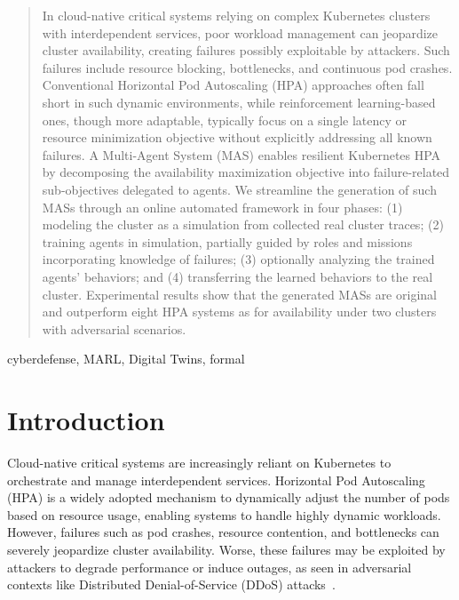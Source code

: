 \documentclass[conference]{IEEEtran}
\begin{document}
\maketitle

\begin{abstract}
  In cloud-native critical systems relying on complex Kubernetes clusters with interdependent services, poor workload management can jeopardize cluster availability, creating failures possibly exploitable by attackers. Such failures include resource blocking, bottlenecks, and continuous pod crashes. Conventional Horizontal Pod Autoscaling (HPA) approaches often fall short in such dynamic environments, while reinforcement learning-based ones, though more adaptable, typically focus on a single latency or resource minimization objective without explicitly addressing all known failures.
  A Multi-Agent System (MAS) enables resilient Kubernetes HPA by decomposing the availability maximization objective into failure-related sub-objectives delegated to agents. We streamline the generation of such MASs through an online automated framework in four phases: (1) modeling the cluster as a simulation from collected real cluster traces; (2) training agents in simulation, partially guided by roles and missions incorporating knowledge of failures; (3) optionally analyzing the trained agents' behaviors; and (4) transferring the learned behaviors to the real cluster.
  Experimental results show that the generated MASs are original and outperform eight HPA systems as for availability under two clusters with adversarial scenarios.
\end{abstract}

\begin{IEEEkeywords}
    cyberdefense, MARL, Digital Twins, formal
\end{IEEEkeywords}

\section{Introduction}
\label{sec:introduction}

Cloud-native critical systems are increasingly reliant on Kubernetes to orchestrate and manage interdependent services. Horizontal Pod Autoscaling (HPA) is a widely adopted mechanism to dynamically adjust the number of pods based on resource usage, enabling systems to handle highly dynamic workloads. However, failures such as pod crashes, resource contention, and bottlenecks can severely jeopardize cluster availability. Worse, these failures may be exploited by attackers to degrade performance or induce outages, as seen in adversarial contexts like Distributed Denial-of-Service (DDoS) attacks~\cite{KubernetesChallenges, AutoscalingLimitations}.
\end{document}
